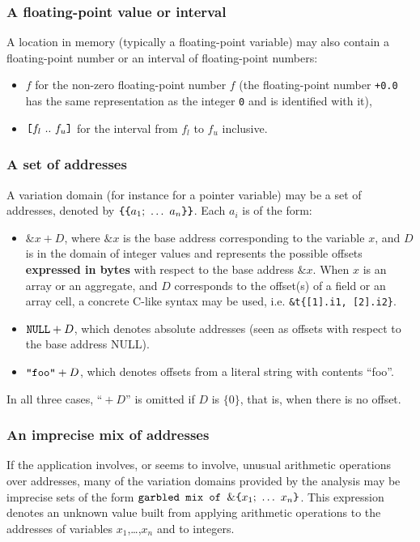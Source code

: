 \documentclass{frama-c-book}
\newcommand{\bropen}{\mbox{\tt [}}
\newcommand{\brclose}{\mbox{\tt ]}}
\newcommand{\cbopen}{\mbox{\tt \{}}
\newcommand{\cbclose}{\mbox{\tt \}}}
\begin{document}
\subsubsection{A floating-point value or interval}
A location in memory (typically a floating-point variable)
may also contain a floating-point number
or an interval of floating-point numbers:
  \begin{itemize}
  \item $f$ for the non-zero floating-point number $f$ (the floating-point number \lstinline|+0.0| has the same representation as the integer \lstinline|0| and is identified with it),
  \item $\bropen f_l\ ..\ f_u\brclose$ for the interval from $f_l$ to
$f_u$ inclusive.
  \end{itemize}
\subsubsection{A set of addresses}
A variation domain (for instance for a pointer variable)
may be a set of addresses, denoted by
       $\cbopen\cbopen a_1;\ \ldots\ a_n \cbclose\cbclose$.
Each $a_i$ is of the form:
  \begin{itemize}
  \item $\&x + D$, where $\&x$ is the base address corresponding to the
    variable $x$, and $D$ is in the domain of integer values and represents
    the possible offsets {\bf expressed in bytes} with respect to the base
    address $\&x$. When $x$ is an array or an aggregate, and $D$ corresponds
    to the offset(s) of a field or an array cell, a concrete C-like syntax
    may be used, i.e. \verb+&t{[1].i1, [2].i2}+.
  \item $\mbox{\tt NULL} + D$, which denotes absolute addresses (seen
as offsets with respect to the base address NULL).
  \item $\mbox{\tt "foo"} + D$, which denotes offsets from a literal
string with contents ``foo''.
  \end{itemize}
In all three cases, ``${}+D$'' is omitted if $D$ is $\{0\}$, that is,
when there is no offset.

\subsubsection{An imprecise mix of addresses}
If the application involves, or seems to involve, unusual arithmetic
operations over addresses, many of the variation domains provided by
the analysis may be imprecise sets of the form
 $\mbox{\tt garbled mix of }\&\cbopen x_1;\ \ldots\ x_n \cbclose$.
This expression
 denotes an unknown value built from applying arithmetic operations
to the addresses of variables $x_1$,\ldots,$x_n$ and to integers.
\end{document}
